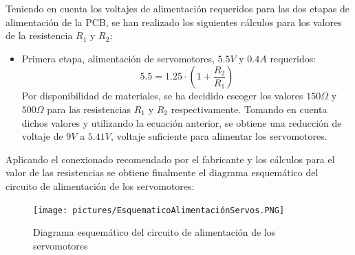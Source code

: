 Teniendo en cuenta los voltajes de alimentación requeridos para las dos etapas de alimentación de la \ac{PCB}, se han realizado los siguientes cálculos para los valores de la resistencia $R_1$ y $R_2$:
\begin{itemize}
    \item Primera etapa, alimentación de servomotores, $5.5V$ y $0.4A$ requeridos:
    \begin{equation}
        5.5 = 1.25 \cdot \left( 1 + \frac{R_2}{R_1}\right) 
    \end{equation}
    Por disponibilidad de materiales, se ha decidido escoger los valores $150\Omega$ y $500\Omega$ para las resistencias $R_1$ y $R_2$ respectivamente. Tomando en cuenta dichos valores y utilizando la ecuación anterior, se obtiene una reducción de voltaje de $9V$ a $5.41V$, voltaje suficiente para alimentar los servomotores.
\end{itemize}

Aplicando el conexionado recomendado por el fabricante y los cálculos para el valor de las resistencias se obtiene finalmente el diagrama esquemático del circuito de alimentación de los servomotores:

\begin{figure}[H]
    \centering 
    \texttt{[image: pictures/EsquematicoAlimentaciónServos.PNG]}
    \caption{Diagrama esquemático del circuito de alimentación de los servomotores}
    \label{fig:CAMBIAR!!!!!!!!!!}
\end{figure}

